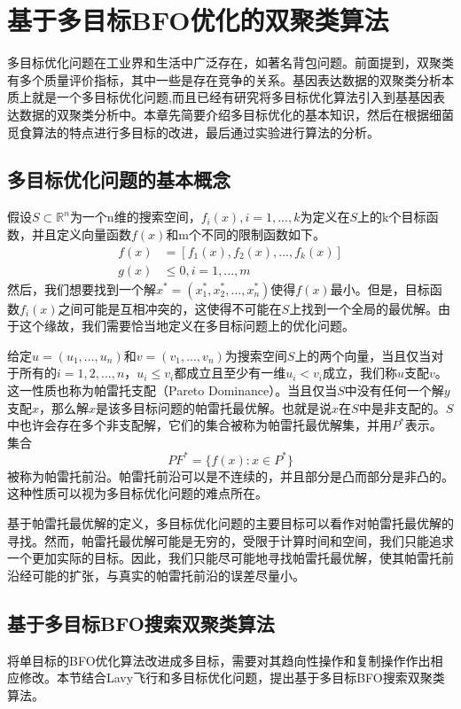 \chapter{基于多目标BFO优化的双聚类算法}
多目标优化问题在工业界和生活中广泛存在，如著名背包问题。前面提到，双聚类有多个质量评价指标，其中一些是存在竞争的关系。基因表达数据的双聚类分析本质上就是一个多目标优化问题,而且已经有研究将多目标优化算法引入到基基因表达数据的双聚类分析中。本章先简要介绍多目标优化的基本知识，然后在根据细菌觅食算法的特点进行多目标的改进，最后通过实验进行算法的分析。

\section{多目标优化问题的基本概念}
假设$S\subset \mathbb{R}^n$为一个n维的搜索空间，$f_i(x),i=1,...,k$为定义在$S$上的k个目标函数，并且定义向量函数$f(x)$和m个不同的限制函数如下。
\begin{align}
   f(x) &= [f_1(x),f_2(x),...,f_k(x)] \\
    g(x) &\leq 0, i= 1,...,m
\end{align}
然后，我们想要找到一个解$x^{\ast} =(x_1^{\ast},x_2^{\ast},...,x_n^{\ast})$使得$f(x)$最小。但是，目标函数$f_i(x)$之间可能是互相冲突的，这使得不可能在$S$上找到一个全局的最优解。由于这个缘故，我们需要恰当地定义在多目标问题上的优化问题。

给定$u=(u_1,...,u_n)$和$v=(v_1,...,v_n)$为搜索空间$S$上的两个向量，当且仅当对于所有的$i=1,2,...,n$，$u_i \le v_i$都成立且至少有一维$u_i<v_i$成立，我们称$u$支配$v$。这一性质也称为帕雷托支配（Pareto Dominance）。当且仅当$S$中没有任何一个解$y$支配$x$，那么解$x$是该多目标问题的帕雷托最优解。也就是说$x$在$S$中是非支配的。$S$中也许会存在多个非支配解，它们的集合被称为帕雷托最优解集，并用$P^*$表示。集合
\begin{equation}
   PF^* = \{f(x): x\in P^*\} 
\end{equation}
被称为帕雷托前沿。帕雷托前沿可以是不连续的，并且部分是凸而部分是非凸的。这种性质可以视为多目标优化问题的难点所在。

基于帕雷托最优解的定义，多目标优化问题的主要目标可以看作对帕雷托最优解的寻找。然而，帕雷托最优解可能是无穷的，受限于计算时间和空间，我们只能追求一个更加实际的目标。因此，我们只能尽可能地寻找帕雷托最优解，使其帕雷托前沿经可能的扩张，与真实的帕雷托前沿的误差尽量小。

\section{基于多目标BFO搜索双聚类算法}
将单目标的BFO优化算法改进成多目标，需要对其趋向性操作和复制操作作出相应修改。本节结合Lavy飞行和多目标优化问题，提出基于多目标BFO搜索双聚类算法。

